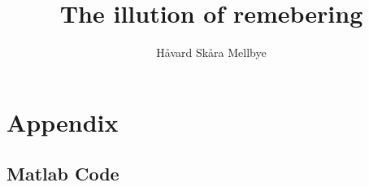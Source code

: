 \documentclass[]{article}
\title{The illution of remebering}
\author{Håvard Skåra Mellbye}
\begin{document}
\maketitle







\printbibliography
\section{Appendix}
\subsection{Matlab Code} \label{sec:matlab_code}


\end{document}
